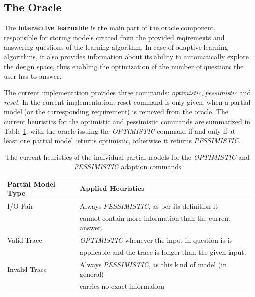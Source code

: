 \subsection{The Oracle} \label{subsec_oracleimpl}
The \textbf{interactive learnable} is the main part of the oracle component, responsible for storing models created from the provided reqirements and answering questions of the learning algorithm. In case of adaptive learning algorithms, it also provides information about its ability to automatically explore the design space, thus enabling the optimization of the number of questions the user has to answer. 

The current implementation provides three commands: \textit{optimistic}, \textit{pessimistic} and \textit{reset}. In the current implementation, reset command is only given, when a partial model (or the corresponding requirement) is removed from the oracle. The current heuristics for the optimistic and pessimistic commands are summarized in Table \ref{tab_implementedheuristics}, with the oracle issuing the \textit{OPTIMISTIC} command if and only if at least one partial model returns optimistic, otherwise it returns \textit{PESSIMISTIC}.

\begin{table}[ht]
	\footnotesize
	\centering
	\begin{tabular}{ l l }
		\toprule
		Partial Model Type & Applied Heuristics \\
		\midrule
		I/O Pair & Always \textit{PESSIMISTIC}, as per its definition it \\ &  cannot contain more information than the current answer. \\
		Valid Trace & \textit{OPTIMISTIC} whenever the input in question is is \\ & applicable and the trace is longer than the given input.  \\
		Invalid Trace & Always \textit{PESSIMISTIC}, as this kind of model (in general) \\ & carries no exact information \\
		\bottomrule
	\end{tabular}
	\caption{The current heuristics of the individual partial models for the \textit{OPTIMISTIC} and \textit{PESSIMISTIC} adaption commands}
	\label{tab_implementedheuristics}
\end{table}

